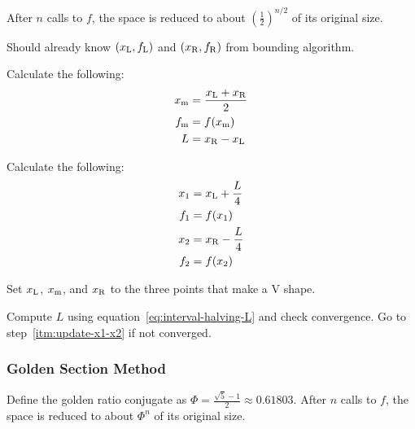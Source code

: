 \documentclass{article}
\begin{document}
After \(n\) calls to \(f\), the space is reduced to about \({\left(\frac12\right)}^{n/2}\) of its
original size.

\begin{enumerate*}
\setcounter{enumi}{-1}
\item Should already know \((x_{\mathrm{L}}, f_{\mathrm{L}})\) and \((x_{\mathrm{R}}, f_{\mathrm{R}})\) from bounding
  algorithm.
\item Calculate the following:
  \begin{align}
    x_{\mathrm{m}} &= \frac{x_{\mathrm{L}} + x_{\mathrm{R}}}{2} \nonumber \\
    f_{\mathrm{m}} &= f(x_{\mathrm{m}}) \nonumber \\
    L &= x_{\mathrm{R}} - x_{\mathrm{L}} \label{eq:interval-halving-L}
  \end{align}
\item \label{itm:update-x1-x2} Calculate the following:
  \begin{align*}
    x_1 &= x_{\mathrm{L}} + \frac{L}{4} \\
    f_1 &= f(x_1) \\
    x_2 &= x_{\mathrm{R}} - \frac{L}{4} \\
    f_2 &= f(x_2)
  \end{align*}
\item Set \(x_{\mathrm{L}}\), \(x_{\mathrm{m}}\), and \(x_{\mathrm{R}}\) to the three points that make a V shape.
\item Compute \(L\) using equation~\ref{eq:interval-halving-L} and check convergence. Go to
  step~\ref{itm:update-x1-x2} if not converged.
\end{enumerate*}

\subsubsection{Golden Section Method}\label{sec:golden-section-region}

Define the golden ratio conjugate as \(\Phi = \frac{\sqrt5-1}{2} \approx 0.61803\). After \(n\)
calls to \(f\), the space is reduced to about \(\Phi^n\) of its original size.
\end{document}
